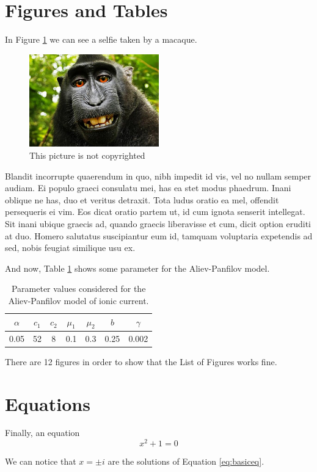 \section{Figures and Tables \label{sec:figandtab}}

In Figure \ref{fig:selfie1} we can see a selfie taken by a macaque.
\begin{figure}[ht]
	\begin{center}
	\includegraphics[width=0.5\textwidth]{./figures/selfie_monkey.jpg}
	\caption[Monkey selfie]{This picture is not copyrighted}
	\label{fig:selfie1}
	\end{center}
\end{figure}

Blandit incorrupte quaerendum in quo, nibh impedit id vis, vel no nullam semper audiam. Ei populo graeci consulatu mei, has ea stet modus phaedrum. Inani oblique ne has, duo et veritus detraxit. Tota ludus oratio ea mel, offendit persequeris ei vim. Eos dicat oratio partem ut, id cum ignota senserit intellegat. Sit inani ubique graecis ad, quando graecis liberavisse et cum, dicit option eruditi at duo. Homero salutatus suscipiantur eum id, tamquam voluptaria expetendis ad sed, nobis feugiat similique usu ex.

And now, Table \ref{tab:apvalues} shows some parameter for the Aliev-Panfilov model.
\begin{table}[H]
	\begin{center}
	\caption[Parameters Aliev-Panfilov]{Parameter values considered for the Aliev-Panfilov model of ionic current{\color{red}.}}
	\begin{tabular}{@{}c  c  c  c  c  c  c@{}}\toprule
	$\alpha$	&	$c_1$	&	$c_2$	&	$\mu_{1}$		&	$\mu_2$		&	$b$	&	$\gamma$\\ \midrule
	0.05	&	52	&	8	&	0.1	&	0.3	&	0.25	&	0.002 \\ \bottomrule
	\end{tabular}
	\label{tab:apvalues}
	\end{center}
\end{table}

There are 12 figures in order to show that the List of Figures works fine.

\section{Equations \label{sec:eq}}
Finally, an equation
\begin{equation}
x^2 + 1 = 0
\label{eq:basiceq}
\end{equation}

We can notice that $x=\pm i$ are the solutions of Equation \eqref{eq:basiceq}.